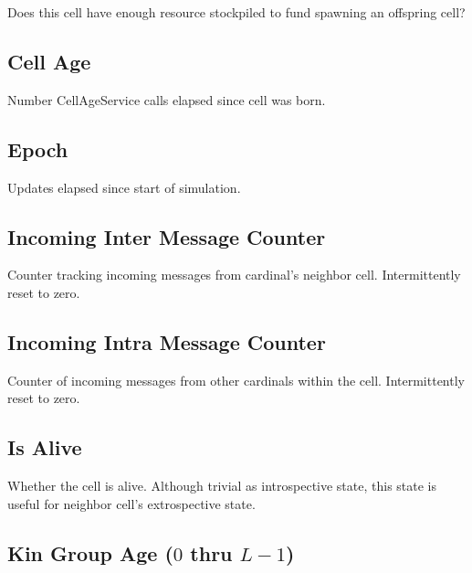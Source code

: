 
Does this cell have enough resource stockpiled to fund spawning an offspring cell?

\subsection{Cell Age}


Number CellAgeService calls elapsed since cell was born.

\subsection{Epoch}


Updates elapsed since start of simulation.

\subsection{Incoming Inter Message Counter}


Counter tracking incoming messages from cardinal's neighbor cell.
Intermittently reset to zero.

\subsection{Incoming Intra Message Counter}


Counter of incoming messages from other cardinals within the cell.
Intermittently reset to zero.

\subsection{Is Alive}


Whether the cell is alive.
Although trivial as introspective state, this state is useful for neighbor cell's extrospective state.

\subsection{Kin Group Age ($0$ thru $L - 1$)}


